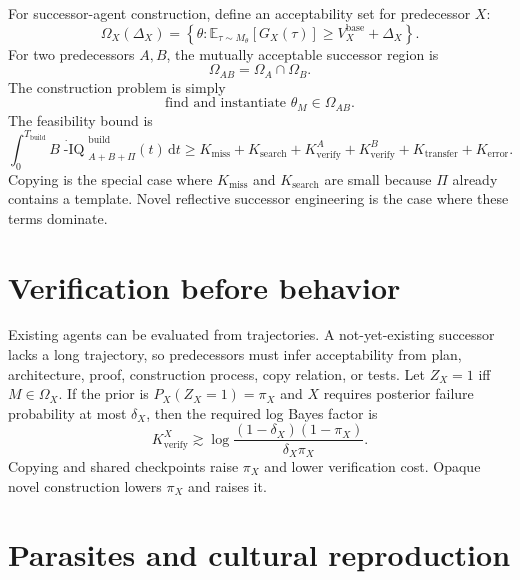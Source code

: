 \documentclass[11pt]{article}
\newcommand{\E}{\mathbb{E}}
\newcommand{\Biq}{B\!\operatorname{-IQ}}
\newcommand{\dd}{\mathrm{d}}
\begin{document}
For successor-agent construction, define an acceptability set for predecessor $X$:
\begin{equation}
  \Omega_X(\Delta_X)=\left\{\theta:\E_{\tau\sim M_\theta}[G_X(\tau)]\ge V_X^{\mathrm{base}}+\Delta_X\right\}.
\end{equation}
For two predecessors $A,B$, the mutually acceptable successor region is
\begin{equation}
  \Omega_{AB}=\Omega_A\cap\Omega_B.
\end{equation}
The construction problem is simply
\begin{equation}
  \text{find and instantiate }\theta_M\in\Omega_{AB}.
\end{equation}
The feasibility bound is
\begin{equation}
  \int_0^{T_{\mathrm{build}}}\dot{\Biq}_{A+B+\Pi}^{\mathrm{build}}(t)\,\dd t
  \ge
  K_{\mathrm{miss}}+K_{\mathrm{search}}+K_{\mathrm{verify}}^A+K_{\mathrm{verify}}^B+K_{\mathrm{transfer}}+K_{\mathrm{error}}.
\end{equation}
Copying is the special case where $K_{\mathrm{miss}}$ and $K_{\mathrm{search}}$ are small because $\Pi$ already contains a template. Novel reflective successor engineering is the case where these terms dominate.

\section{Verification before behavior}

Existing agents can be evaluated from trajectories. A not-yet-existing successor lacks a long trajectory, so predecessors must infer acceptability from plan, architecture, proof, construction process, copy relation, or tests. Let $Z_X=1$ iff $M\in\Omega_X$. If the prior is $P_X(Z_X=1)=\pi_X$ and $X$ requires posterior failure probability at most $\delta_X$, then the required log Bayes factor is
\begin{equation}
  K_{\mathrm{verify}}^X\gtrsim
  \log\frac{(1-\delta_X)(1-\pi_X)}{\delta_X\pi_X}.
\end{equation}
Copying and shared checkpoints raise $\pi_X$ and lower verification cost. Opaque novel construction lowers $\pi_X$ and raises it.

\section{Parasites and cultural reproduction}
\end{document}
